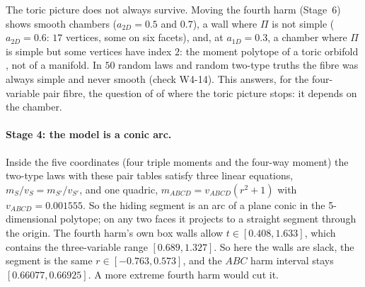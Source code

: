 \documentclass[11pt]{article}
\theoremstyle{definition}\newtheorem{definition}{Definition}\newtheorem{remark}{Remark}
\begin{document}
The toric picture does not always survive. Moving the fourth harm (Stage~6) shows smooth chambers ($a_{2D}=0.5$ and $0.7$), a wall
where $\Pi$ is not simple ($a_{2D}=0.6$: $17$ vertices, some on six facets), and, at $a_{1D}=0.3$, a chamber where $\Pi$ is simple but
some vertices have index $2$: the moment polytope of a toric orbifold \cite{LermanTolman1997}, not of a manifold. In $50$ random laws and
random two-type truths the fibre was always simple and never smooth (check W4-14). This answers, for the four-variable pair fibre, the question of \cite[Prop.~10.5]{Coupling}
of where the toric picture stops: it depends on the chamber.

\paragraph{Stage 4: the model is a conic arc.} Inside the five coordinates (four triple moments and the four-way moment) the two-type
laws with these pair tables satisfy three linear equations, $m_S/v_S=m_{S'}/v_{S'}$, and one quadric, $m_{ABCD}=v_{ABCD}(r^2+1)$ with
$v_{ABCD}=0.001555$. So the hiding segment is an arc of a plane conic in the 5-dimensional polytope; on any two faces it projects to a
straight segment through the origin. The fourth harm's own box walls allow $t\in[0.408,1.633]$, which contains the three-variable
range $[0.689,1.327]$. So here the walls are slack, the segment is the same $r\in[-0.763,0.573]$, and the $ABC$ harm interval stays
$[0.66077,0.66925]$. A more extreme fourth harm would cut it.
\end{document}
